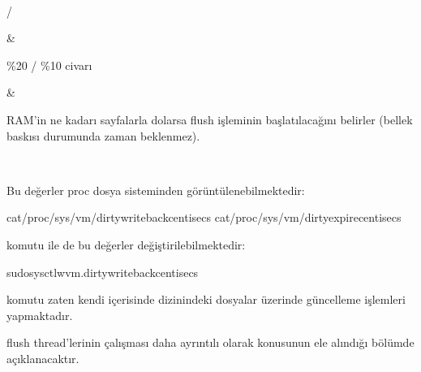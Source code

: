 \documentclass[a4paper,10pt,turkish]{sphinxmanual}
\begin{document}
\begin{savenotes}
\begin{tabular}[t]{}
\begin{varwidth}[t]{}
\sphinxbeforeendvarwidth
\end{varwidth}%
\\
\sphinxhline\begin{varwidth}[t]{}
\sphinxAtStartPar
{} / 
\sphinxbeforeendvarwidth
\end{varwidth}%
&\begin{varwidth}[t]{}
\sphinxAtStartPar
\%20 / \%10 civarı
\sphinxbeforeendvarwidth
\end{varwidth}%
&\begin{varwidth}[t]{}
\sphinxAtStartPar
RAM’in ne kadarı  sayfalarla dolarsa flush işleminin başlatılacağını belirler
(bellek baskısı durumunda zaman beklenmez).
\sphinxbeforeendvarwidth
\end{varwidth}%
\\
\sphinxbottomrule
\end{tabular}
\sphinxtableafterendhook\par
\sphinxattableend\end{savenotes}

\sphinxAtStartPar
Bu değerler proc dosya sisteminden görüntülenebilmektedir:

\begin{sphinxVerbatim}[commandchars=\\\{\}]
\PYGZdl{}cat/proc/sys/vm/dirty\PYGZus{}writeback\PYGZus{}centisecs
\PYGZdl{}cat/proc/sys/vm/dirty\PYGZus{}expire\PYGZus{}centisecs
\end{sphinxVerbatim}

\sphinxAtStartPar
{} komutu ile de bu değerler değiştirilebilmektedir:

\begin{sphinxVerbatim}[commandchars=\\\{\}]
\PYGZdl{}sudosysctl\PYGZhy{}wvm.dirty\PYGZus{}writeback\PYGZus{}centisecs
\end{sphinxVerbatim}

\sphinxAtStartPar
{} komutu zaten kendi içerisinde  dizinindeki dosyalar üzerinde güncelleme
işlemleri yapmaktadır.

\sphinxAtStartPar
flush thread’lerinin çalışması daha ayrıntılı olarak  konusunun
ele alındığı bölümde açıklanacaktır.
\end{document}
